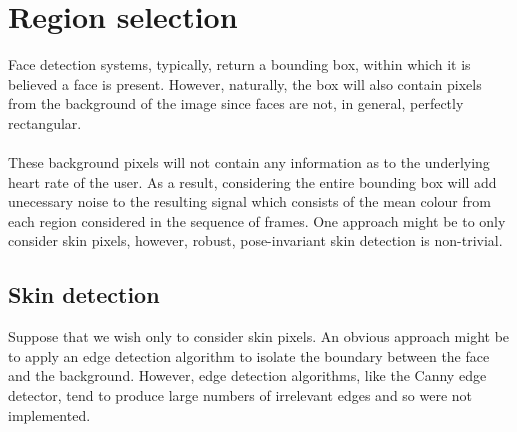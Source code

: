 \section{Region selection}
\label{ref:region_selection_impl}
Face detection systems, typically, return a bounding box, within which it is believed
a face is present. However, naturally, the box will also contain pixels from the background of 
the image since faces are not, in general, perfectly rectangular.  \\ \\
These background pixels will not contain any information as to the underlying heart rate of the user.
As a result, considering the entire bounding box will add unecessary noise to the resulting signal which consists of the mean colour from each region considered in the sequence of frames.
One approach might be to only consider skin pixels, however, robust, pose-invariant skin detection is non-trivial.

\subsection{Skin detection}
Suppose that we wish only to consider skin pixels. An obvious approach might be to apply an edge detection algorithm to isolate the boundary between the face and the background. However, edge detection algorithms, like the Canny edge detector, tend to produce large numbers of irrelevant edges and so were not implemented.

